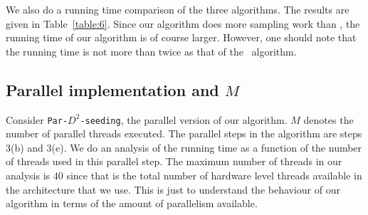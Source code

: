 

We also do a running time comparison of the three algorithms.
The results are given in Table~\ref{table:6}.
Since our algorithm does more sampling work than \kmpp, the running time of our algorithm is of course larger. 
However, one should note that the running time is not more than twice as that of the \kmpp\ algorithm.



\subsection{Parallel implementation and $M$}
Consider \texttt{Par-$D^2$-seeding}, the parallel version of our algorithm.
$M$ denotes the number of parallel threads executed.
The parallel steps in the algorithm are steps 3(b) and 3(e). 
We do an analysis of the running time as a function of the number of threads used in this parallel step.
The maximum number of threads in our analysis is $40$ since that is the total number of  hardware level threads available in the architecture that we use. 
This is just to understand the behaviour of our algorithm in terms of the amount of parallelism available.



